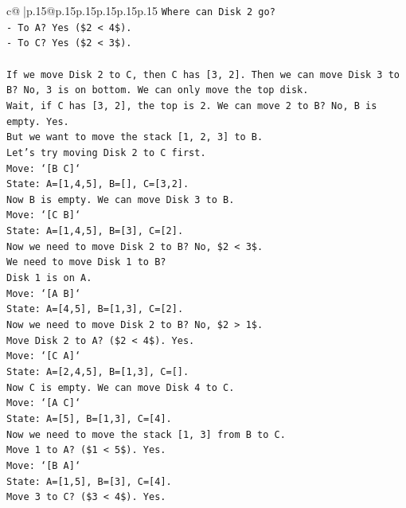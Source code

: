 \documentclass{article}
\begin{document}
{\begin{supertabular}{c@{$\;$}|p{.15\linewidth}@{}p{.15\linewidth}p{.15\linewidth}p{.15\linewidth}p{.15\linewidth}p{.15\linewidth}}
{{{\texttt{Where can Disk 2 go?} \\
\texttt{{-} To A? Yes (\$2 < 4\$).} \\
\texttt{{-} To C? Yes (\$2 < 3\$).} \\
\\ 
\texttt{If we move Disk 2 to C, then C has {[}3, 2{]}. Then we can move Disk 3 to B? No, 3 is on bottom. We can only move the top disk.} \\
\texttt{Wait, if C has {[}3, 2{]}, the top is 2. We can move 2 to B? No, B is empty. Yes.} \\
\texttt{But we want to move the stack {[}1, 2, 3{]} to B.} \\
\texttt{Let's try moving Disk 2 to C first.} \\
\texttt{Move: `{[}B C{]}`} \\
\texttt{State: A={[}1,4,5{]}, B={[}{]}, C={[}3,2{]}.} \\
\texttt{Now B is empty. We can move Disk 3 to B.} \\
\texttt{Move: `{[}C B{]}`} \\
\texttt{State: A={[}1,4,5{]}, B={[}3{]}, C={[}2{]}.} \\
\texttt{Now we need to move Disk 2 to B? No, \$2 < 3\$.} \\
\texttt{We need to move Disk 1 to B?} \\
\texttt{Disk 1 is on A.} \\
\texttt{Move: `{[}A B{]}`} \\
\texttt{State: A={[}4,5{]}, B={[}1,3{]}, C={[}2{]}.} \\
\texttt{Now we need to move Disk 2 to B? No, \$2 > 1\$.} \\
\texttt{Move Disk 2 to A? (\$2 < 4\$). Yes.} \\
\texttt{Move: `{[}C A{]}`} \\
\texttt{State: A={[}2,4,5{]}, B={[}1,3{]}, C={[}{]}.} \\
\texttt{Now C is empty. We can move Disk 4 to C.} \\
\texttt{Move: `{[}A C{]}`} \\
\texttt{State: A={[}5{]}, B={[}1,3{]}, C={[}4{]}.} \\
\texttt{Now we need to move the stack {[}1, 3{]} from B to C.} \\
\texttt{Move 1 to A? (\$1 < 5\$). Yes.} \\
\texttt{Move: `{[}B A{]}`} \\
\texttt{State: A={[}1,5{]}, B={[}3{]}, C={[}4{]}.} \\
\texttt{Move 3 to C? (\$3 < 4\$). Yes.} \\
}}}
\end{supertabular}}
\end{document}
